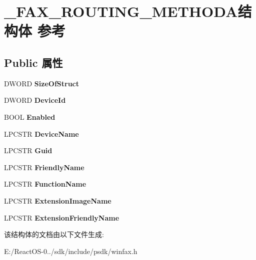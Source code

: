 \hypertarget{struct___f_a_x___r_o_u_t_i_n_g___m_e_t_h_o_d_a}{}\section{\+\_\+\+F\+A\+X\+\_\+\+R\+O\+U\+T\+I\+N\+G\+\_\+\+M\+E\+T\+H\+O\+D\+A结构体 参考}
\label{struct___f_a_x___r_o_u_t_i_n_g___m_e_t_h_o_d_a}
\subsection*{Public 属性}
\begin{DoxyCompactItemize}
\item 
\mbox{\label{struct___f_a_x___r_o_u_t_i_n_g___m_e_t_h_o_d_a_a5086edf10b76623cb2f37ce565912ad8}} 
D\+W\+O\+RD {\bfseries Size\+Of\+Struct}
\item 
\mbox{\label{struct___f_a_x___r_o_u_t_i_n_g___m_e_t_h_o_d_a_a208fbcd2a0a502390599c8f602d2fe9c}} 
D\+W\+O\+RD {\bfseries Device\+Id}
\item 
\mbox{\label{struct___f_a_x___r_o_u_t_i_n_g___m_e_t_h_o_d_a_a7383199686f1312d95440f1be1394e18}} 
B\+O\+OL {\bfseries Enabled}
\item 
\mbox{\label{struct___f_a_x___r_o_u_t_i_n_g___m_e_t_h_o_d_a_ae62737e8140fee3ac5422b42b826b187}} 
L\+P\+C\+S\+TR {\bfseries Device\+Name}
\item 
\mbox{\label{struct___f_a_x___r_o_u_t_i_n_g___m_e_t_h_o_d_a_ae356072e5bab8211ce7349effd83d0e8}} 
L\+P\+C\+S\+TR {\bfseries Guid}
\item 
\mbox{\label{struct___f_a_x___r_o_u_t_i_n_g___m_e_t_h_o_d_a_ad967b70185e00a277f24af632ac8cbed}} 
L\+P\+C\+S\+TR {\bfseries Friendly\+Name}
\item 
\mbox{\label{struct___f_a_x___r_o_u_t_i_n_g___m_e_t_h_o_d_a_ac3743400c59e0f43c98a3e1dfc4bbcba}} 
L\+P\+C\+S\+TR {\bfseries Function\+Name}
\item 
\mbox{\label{struct___f_a_x___r_o_u_t_i_n_g___m_e_t_h_o_d_a_a2a745e008463e4008404b60edc431548}} 
L\+P\+C\+S\+TR {\bfseries Extension\+Image\+Name}
\item 
\mbox{\label{struct___f_a_x___r_o_u_t_i_n_g___m_e_t_h_o_d_a_a3cc1ffb5b2e76930f303b0d92703d2cf}} 
L\+P\+C\+S\+TR {\bfseries Extension\+Friendly\+Name}
\end{DoxyCompactItemize}


该结构体的文档由以下文件生成\+:\begin{DoxyCompactItemize}
\item 
E\+:/\+React\+O\+S-\/0../sdk/include/psdk/winfax.\+h\end{DoxyCompactItemize}
